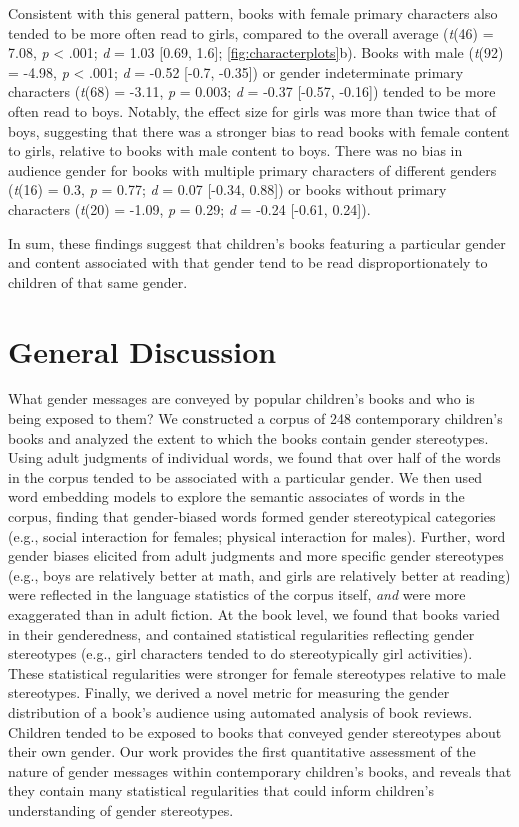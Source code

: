 \documentclass[
  english,
  ,man,floatsintext]{apa6}
\begin{document}
Consistent with this general pattern, books with female primary characters also tended to be more often read to girls, compared to the overall average (\emph{t}(46) = 7.08, \emph{p} \textless{} .001; \emph{d} = 1.03 {[}0.69, 1.6{]}; \autoref{fig:characterplots}b). Books with male (\emph{t}(92) = -4.98, \emph{p} \textless{} .001; \emph{d} = -0.52 {[}-0.7, -0.35{]}) or gender indeterminate primary characters (\emph{t}(68) = -3.11, \emph{p} = 0.003; \emph{d} = -0.37 {[}-0.57, -0.16{]}) tended to be more often read to boys. Notably, the effect size for girls was more than twice that of boys, suggesting that there was a stronger bias to read books with female content to girls, relative to books with male content to boys. There was no bias in audience gender for books with multiple primary characters of different genders (\emph{t}(16) = 0.3, \emph{p} = 0.77; \emph{d} = 0.07 {[}-0.34, 0.88{]}) or books without primary characters (\emph{t}(20) = -1.09, \emph{p} = 0.29; \emph{d} = -0.24 {[}-0.61, 0.24{]}).

In sum, these findings suggest that children's books featuring a particular gender and content associated with that gender tend to be read disproportionately to children of that same gender.

\hypertarget{general-discussion}{%
\section{General Discussion}\label{general-discussion}}

What gender messages are conveyed by popular children's books and who is being exposed to them? We constructed a corpus of 248 contemporary children's books and analyzed the extent to which the books contain gender stereotypes. Using adult judgments of individual words, we found that over half of the words in the corpus tended to be associated with a particular gender. We then used word embedding models to explore the semantic associates of words in the corpus, finding that gender-biased words formed gender stereotypical categories (e.g., social interaction for females; physical interaction for males). Further, word gender biases elicited from adult judgments and more specific gender stereotypes (e.g., boys are relatively better at math, and girls are relatively better at reading) were reflected in the language statistics of the corpus itself, \emph{and} were more exaggerated than in adult fiction. At the book level, we found that books varied in their genderedness, and contained statistical regularities reflecting gender stereotypes (e.g., girl characters tended to do stereotypically girl activities). These statistical regularities were stronger for female stereotypes relative to male stereotypes. Finally, we derived a novel metric for measuring the gender distribution of a book's audience using automated analysis of book reviews. Children tended to be exposed to books that conveyed gender stereotypes about their own gender. Our work provides the first quantitative assessment of the nature of gender messages within contemporary children's books, and reveals that they contain many statistical regularities that could inform children's understanding of gender stereotypes.
\end{document}
